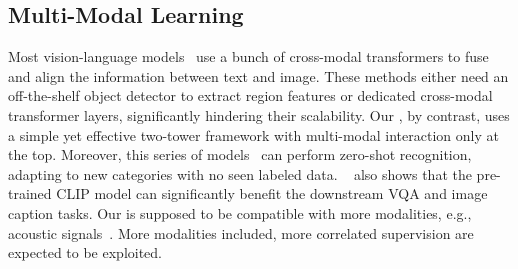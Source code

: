 \subsection{Multi-Modal Learning}
Most vision-language models~\cite{chen2020uniter,lu2019vilbert,li2020oscar} use a bunch of cross-modal transformers to fuse and align the information between text and image.
These methods either need an off-the-shelf object detector to extract region features or dedicated cross-modal transformer layers, significantly hindering their scalability. 
Our \workname, by contrast, uses a simple yet effective two-tower framework with multi-modal interaction only at the top. Moreover, this series of models~\citep{radford2021learning, jia2021scaling, huo2021wenlan} can perform zero-shot recognition, adapting to new categories with no seen labeled data. ~\citet{shen2021much} also shows that the pre-trained CLIP model can significantly benefit the downstream VQA and image caption tasks.
Our \workname is supposed to be compatible with more modalities, e.g., acoustic signals~\citep{akbari2021vatt}. More modalities included, more correlated supervision are expected to be exploited. 
